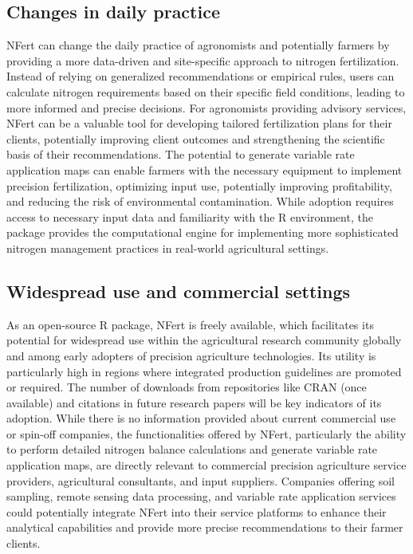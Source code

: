 \documentclass[
  11pt,
]{article}
\begin{document}
\subsection{Changes in daily practice}\label{changes-in-daily-practice}

NFert can change the daily practice of agronomists and potentially
farmers by providing a more data-driven and site-specific approach to
nitrogen fertilization. Instead of relying on generalized
recommendations or empirical rules, users can calculate nitrogen
requirements based on their specific field conditions, leading to more
informed and precise decisions. For agronomists providing advisory
services, NFert can be a valuable tool for developing tailored
fertilization plans for their clients, potentially improving client
outcomes and strengthening the scientific basis of their
recommendations. The potential to generate variable rate application
maps can enable farmers with the necessary equipment to implement
precision fertilization, optimizing input use, potentially improving
profitability, and reducing the risk of environmental contamination.
While adoption requires access to necessary input data and familiarity
with the R environment, the package provides the computational engine
for implementing more sophisticated nitrogen management practices in
real-world agricultural settings.

\subsection{Widespread use and commercial
settings}\label{widespread-use-and-commercial-settings}

As an open-source R package, NFert is freely available, which
facilitates its potential for widespread use within the agricultural
research community globally and among early adopters of precision
agriculture technologies. Its utility is particularly high in regions
where integrated production guidelines are promoted or required. The
number of downloads from repositories like CRAN (once available) and
citations in future research papers will be key indicators of its
adoption. While there is no information provided about current
commercial use or spin-off companies, the functionalities offered by
NFert, particularly the ability to perform detailed nitrogen balance
calculations and generate variable rate application maps, are directly
relevant to commercial precision agriculture service providers,
agricultural consultants, and input suppliers. Companies offering soil
sampling, remote sensing data processing, and variable rate application
services could potentially integrate NFert into their service platforms
to enhance their analytical capabilities and provide more precise
recommendations to their farmer clients.
\end{document}
